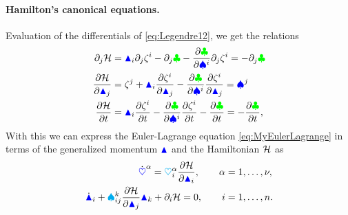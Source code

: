 \paragraph{Hamilton's canonical equations.}
Evaluation of the differentials of \eqref{eq:Legendre12}, we get the relations
\begin{subequations}\label{eq:Legendre2}
\begin{align}
 \partial_{\LidxII} \Hamiltonian &= \genMomentumCoeff{\LidxI} \partial_{\LidxII}\zeta^{\LidxI} - \partial_{\LidxII} \Lagrangian - \pdiff[\Lagrangian]{\sysVelCoeff{\LidxI}} \partial_{\LidxII}\zeta^{\LidxI}
 =  -\partial_{\LidxII} \Lagrangian
\\
 \pdiff[\Hamiltonian]{\genMomentumCoeff{\LidxII}} &= \zeta^{\LidxII} + \genMomentumCoeff{\LidxI} \pdiff[\zeta^{\LidxI}]{\genMomentumCoeff{\LidxII}} - \pdiff[\Lagrangian]{\sysVelCoeff{\LidxI}} \pdiff[\zeta^{\LidxI}]{\genMomentumCoeff{\LidxII}}
 = \sysVelCoeff{\LidxII}
\\
 \pdiff[\Hamiltonian]{t} &= \genMomentumCoeff{\LidxI} \pdiff[\zeta^{\LidxI}]{t} - \pdiff[\Lagrangian]{\sysVelCoeff{\LidxI}} \pdiff[\zeta^{\LidxI}]{t} - \pdiff[\Lagrangian]{t}
 = -\pdiff[\Lagrangian]{t},
\end{align}
\end{subequations}
With this we can express the Euler-Lagrange equation \eqref{eq:MyEulerLagrange} in terms of the generalized momentum $\genMomentum$ and the Hamiltonian $\Hamiltonian$ as
\begin{subequations}\label{eq:HamiltonsCanonicalEquations}
\begin{align}
 \sysCoordCoeffd{\GidxI} = \kinMatCoeff{\GidxI}{\LidxI} \pdiff[\Hamiltonian]{\genMomentumCoeff{\LidxI}}, \qquad \GidxI &= 1,\ldots,\numCoord,
\\
 \genMomentumCoeffd{\LidxI} + \BoltzSym{\LidxIII}{\LidxI}{\LidxII} \pdiff[\Hamiltonian]{\genMomentumCoeff{\LidxII}} \genMomentumCoeff{\LidxIII} + \dirDiff{\LidxI}\Hamiltonian = 0, \qquad \LidxI &= 1,\ldots,\dimConfigSpace.
\end{align} 
\end{subequations}
